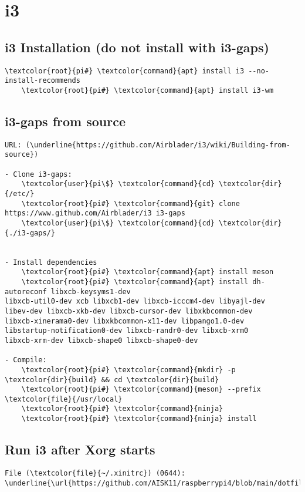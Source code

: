 \documentclass[10pt, a4paper, onecolumn, openany]{book} %
\begin{document}
\section{i3}
\subsection{i3 Installation (do not install with i3-gaps)}
\begin{Verbatim}[commandchars=\\\{\}]
    \textcolor{root}{pi#} \textcolor{command}{apt} install i3 --no-install-recommends
    \textcolor{root}{pi#} \textcolor{command}{apt} install i3-wm 
\end{Verbatim}
\subsection{i3-gaps from source}
\begin{Verbatim}[commandchars=\\\{\}]
URL: (\underline{https://github.com/Airblader/i3/wiki/Building-from-source})

- Clone i3-gaps:
    \textcolor{user}{pi\$} \textcolor{command}{cd} \textcolor{dir}{/etc/}
    \textcolor{root}{pi#} \textcolor{command}{git} clone https://www.github.com/Airblader/i3 i3-gaps
    \textcolor{user}{pi\$} \textcolor{command}{cd} \textcolor{dir}{./i3-gaps/}


- Install dependencies
    \textcolor{root}{pi#} \textcolor{command}{apt} install meson
    \textcolor{root}{pi#} \textcolor{command}{apt} install dh-autoreconf libxcb-keysyms1-dev 
libxcb-util0-dev xcb libxcb1-dev libxcb-icccm4-dev libyajl-dev
libev-dev libxcb-xkb-dev libxcb-cursor-dev libxkbcommon-dev 
libxcb-xinerama0-dev libxkbcommon-x11-dev libpango1.0-dev
libstartup-notification0-dev libxcb-randr0-dev libxcb-xrm0 
libxcb-xrm-dev libxcb-shape0 libxcb-shape0-dev

- Compile:
    \textcolor{root}{pi#} \textcolor{command}{mkdir} -p \textcolor{dir}{build} && cd \textcolor{dir}{build}
    \textcolor{root}{pi#} \textcolor{command}{meson} --prefix \textcolor{file}{/usr/local}
    \textcolor{root}{pi#} \textcolor{command}{ninja}
    \textcolor{root}{pi#} \textcolor{command}{ninja} install
\end{Verbatim}

\subsection{Run i3 after Xorg starts}
\begin{Verbatim}[commandchars=\\\{\}]
File (\textcolor{file}{~/.xinitrc}) (0644):
\underline{\url{https://github.com/AISK11/raspberrypi4/blob/main/dotfiles/.xinitrc}}
\end{Verbatim}
\end{document}
